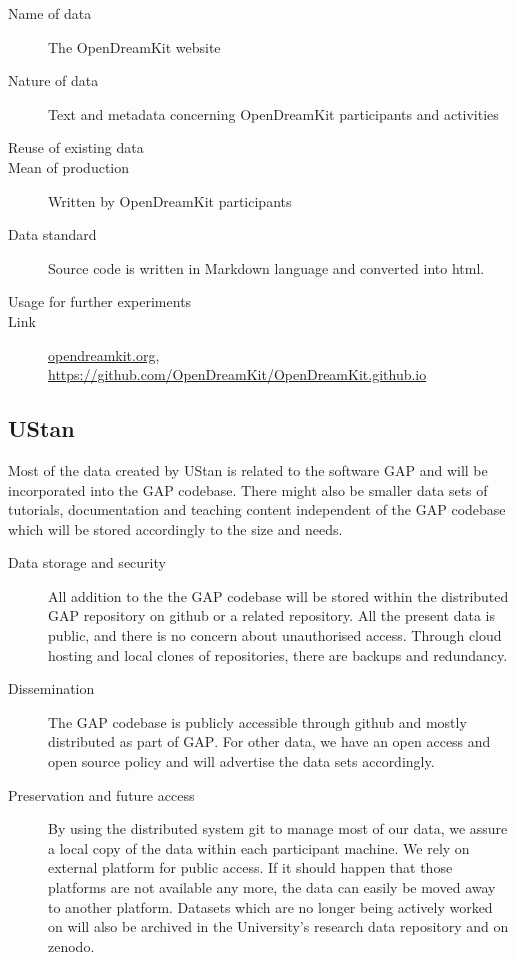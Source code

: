 \documentclass[12pt]{article}
\newcommand{\software}[1]{\textsc{#1}\xspace}
\newcommand{\GAP}{\software{GAP}}
\begin{document}
\begin{enumerate}
\begin{description}
\item[Name of data] The OpenDreamKit website
\item[Nature of data] Text and metadata concerning OpenDreamKit participants and activities
\item[Reuse of existing data]
\item[Mean of production] Written by OpenDreamKit participants
\item[Data standard] Source code is written in Markdown language and converted into html.
\item [Usage for further experiments]
\item [Link] \href{http://opendreamkit.org/}{opendreamkit.org}, \href{https://github.com/OpenDreamKit/OpenDreamKit.github.io}{https://github.com/OpenDreamKit/OpenDreamKit.github.io}
\end{description}

\end{enumerate}
\subsection{UStan}

Most of the data created by UStan is related to the software \GAP and
will be incorporated into the \GAP codebase. There might also be
smaller data sets of tutorials, documentation and teaching content
independent of the \GAP codebase which will be stored accordingly to
the size and needs.
\begin{description}
\item[Data storage and security] All addition to the the \GAP
  codebase will be stored within the distributed \GAP repository on
  github or a related repository. All the present data is
  public, and there is no concern about unauthorised access. Through
  cloud hosting and local clones of repositories, there are backups
  and redundancy.
\item[Dissemination] The \GAP codebase is publicly accessible through
  github and mostly distributed as part of \GAP.
  For other data, we have an open access and open source policy and will advertise the data sets accordingly.

\item[Preservation and future access] By using the distributed system
  git to manage most of our data, we assure a local copy of the data
  within each participant machine. We rely on external platform for public access. If it should happen that those
  platforms are not available any more, the data can easily be moved
  away to another platform. Datasets which are no longer being
  actively worked on will also be archived in the University's
  research data repository and on zenodo.
\end{description}
\end{document}
